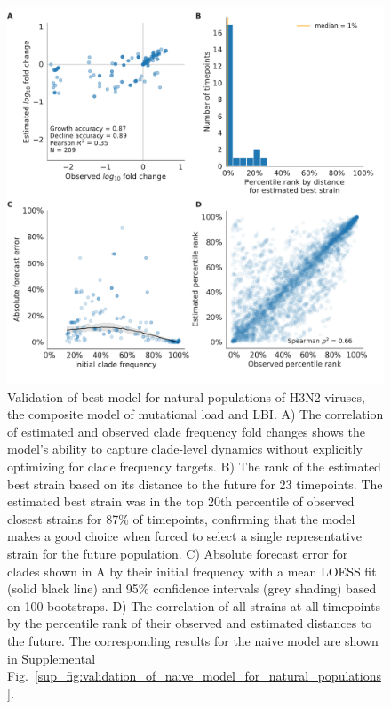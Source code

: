 \begin{figure}[H]
  \begin{center}
  \includegraphics[width=\textwidth]{figures/validation_figure_natural-natural_sample_1_with_90_vpm_sliding-ne_star-lbi.pdf}
  \caption{
  Validation of best model for natural populations of H3N2 viruses, the composite model of mutational load and LBI.
  A) The correlation of estimated and observed clade frequency fold changes shows the model's ability to capture clade-level dynamics without explicitly optimizing for clade frequency targets.
  B) The rank of the estimated best strain based on its distance to the future for 23 timepoints.
  The estimated best strain was in the top 20th percentile of observed closest strains for 87\% of timepoints, confirming that the model makes a good choice when forced to select a single representative strain for the future population.
  C) Absolute forecast error for clades shown in A by their initial frequency with a mean LOESS fit (solid black line) and 95\% confidence intervals (grey shading) based on 100 bootstraps.
  D) The correlation of all strains at all timepoints by the percentile rank of their observed and estimated distances to the future.
  The corresponding results for the naive model are shown in Supplemental Fig.~\ref{sup_fig:validation_of_naive_model_for_natural_populations}.
  }
  \label{sup_fig:validation_of_best_model_for_natural_populations}
  \end{center}
\end{figure}

